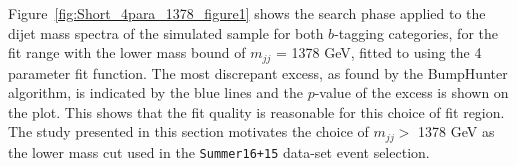 Figure~\ref{fig:Short_4para_1378_figure1} shows the search phase applied to the dijet mass spectra
of the simulated sample for both $b$-tagging categories,
for the fit range with the lower mass bound of $m_{jj}$ = 1378 GeV,
fitted to using the 4 parameter fit function.
The most discrepant excess, as found by the BumpHunter algorithm, is indicated by the blue lines
and the \mbox{$p$-value} of the excess is shown on the plot.
This shows that the fit quality is reasonable for this choice of fit region.
The study presented in this section motivates the choice of $m_{jj} >$ 1378 GeV
as the lower mass cut used in the \verb|Summer16+15| data-set event selection.

\begin{figure}[!htb]
  \begin{center}
    \captionsetup[subfigure]{aboveskip=0pt,justification=centering}
    \\

\end{center}
\end{figure}
